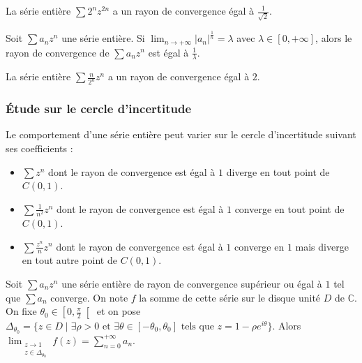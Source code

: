 	\begin{example}
		La série entière $\sum 2^n z^{2n}$ a un rayon de convergence égal à $\frac{1}{\sqrt{2}}$.
	\end{example}

	\begin{corollary}
		Soit $\sum a_n z^n$ une série entière. Si $\lim_{n \rightarrow +\infty} \left| a_n \right|^{\frac{1}{n}} = \lambda$ avec $\lambda \in [0, +\infty]$, alors le rayon de convergence de $\sum a_n z^n$ est égal à $\frac{1}{\lambda}$.
	\end{corollary}

	\begin{example}
		La série entière $\sum \frac{n}{2^n} z^n$ a un rayon de convergence égal à $2$.
	\end{example}

	\subsubsection{Étude sur le cercle d'incertitude}


	\begin{example}
		Le comportement d'une série entière peut varier sur le cercle d'incertitude suivant ses coefficients :
		\begin{itemize}
			\item $\sum z^n$ dont le rayon de convergence est égal à $1$ diverge en tout point de $C(0,1)$.
			\item $\sum \frac{1}{n^2} z^n$ dont le rayon de convergence est égal à $1$ converge en tout point de $C(0,1)$.
			\item $\sum \frac{z^n}{n} z^n$ dont le rayon de convergence est égal à $1$ converge en $1$ mais diverge en tout autre point de $C(0,1)$.
		\end{itemize}
	\end{example}


	\begin{theorem}
		\label{243-1}
		Soit $\sum a_n z^n$ une série entière de rayon de convergence supérieur ou égal à $1$ tel que $\sum a_n$ converge. On note $f$ la somme de cette série sur le disque unité $D$ de $\mathbb{C}$. On fixe $\theta_0 \in \left[ 0, \frac{\pi}{2} \right[$ et on pose $\Delta_{\theta_0} = \{ z \in D \mid \exists \rho > 0 \text{ et } \exists \theta \in [-\theta_0, \theta_0] \text{ tels que } z = 1 - \rho e^{i\theta} \}$.
		\newpar
		Alors $\lim_{\substack{z \rightarrow 1 \\ z \in \Delta_{\theta_0}}} f(z) = \sum_{n=0}^{+\infty} a_n$.
	\end{theorem}

